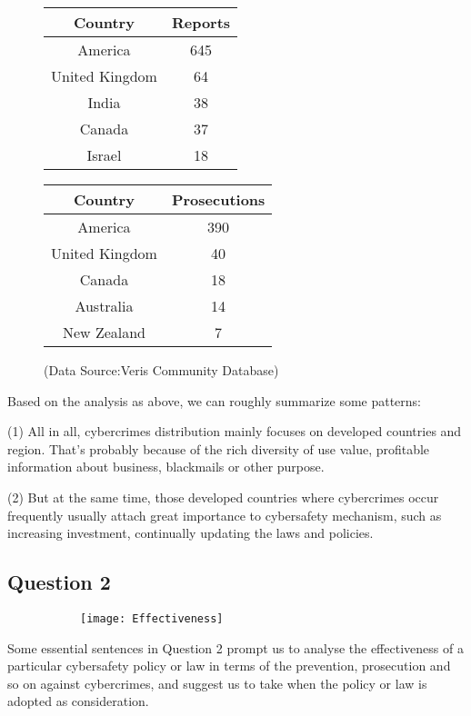 \documentclass[12pt]{article}
\begin{document}
\begin{figure}[H]
	\begin{minipage}[t]{0.45\textwidth}
		\centering
		\begin{tabular}{|c|c|}
			\hline
			Country & Reports \\
			\hline
			America & 645 \\
			\hline
			United Kingdom & 64 \\
			\hline
			India & 38 \\
			\hline
			Canada & 37 \\
			\hline
			Israel & 18 \\
			\hline
		\end{tabular}
		\label{tab:sub2}
	\end{minipage}
	\hfill
	\begin{minipage}[t]{0.45\textwidth}
		\centering
		\begin{tabular}{|c|c|}
			\hline
			Country & Prosecutions \\
			\hline
			America & 390 \\
			\hline
			United Kingdom & 40 \\
			\hline
			Canada & 18 \\
			\hline
			Australia & 14 \\
			\hline
			New Zealand & 7 \\
			\hline
		\end{tabular}
		\label{tab:sub3}
	\end{minipage}
	\caption{(Data Source:Veris Community Database)}
	\label{tab:combined_tables}
\end{figure}


	
	
	Based on the analysis as above, we can roughly summarize some patterns:
	 
	 
	 (1) All in all, cybercrimes distribution mainly focuses on developed countries and region. That’s probably because of the rich diversity of use value, profitable information about business, blackmails or other purpose.
	
	
	 (2) But at the same time, those developed countries where cybercrimes occur frequently usually attach great importance to cybersafety mechanism, such as increasing investment, continually updating the laws and policies.
	 
	 	\subsection{Question 2}
	 			\begin{figure}[H]
	 	
	 	\centering
	 	\begin{subfigure}
	 		\centering
	 		\texttt{[image: Effectiveness]}
	 		\label{Effectiveness}
	 	\end{subfigure}
	 	
	 \end{figure}
	 Some essential sentences in Question 2 prompt us to analyse the effectiveness of a particular cybersafety policy or law in terms of the prevention, prosecution and so on against cybercrimes, and suggest us to take when the policy or law is adopted as consideration.
	 
\end{document}
